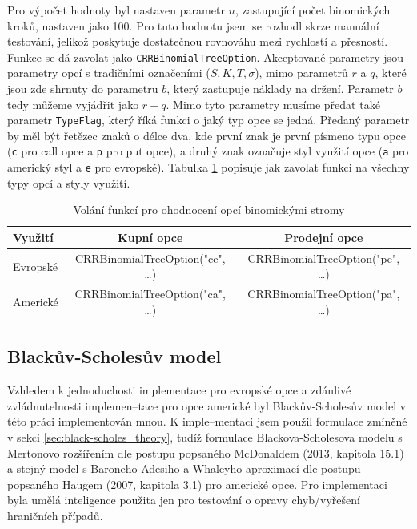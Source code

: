 \documentclass[male,czech,api_bc]{kitheses}
\begin{document}
  Pro výpočet hodnoty byl nastaven parametr $n$, zastupující počet binomických kroků, nastaven jako 100. Pro tuto hodnotu jsem se rozhodl skrze manuální testování, jelikož poskytuje dostatečnou rovnováhu mezi rychlostí a přesností. Funkce se dá zavolat jako \texttt{CRRBinomialTreeOption}. Akceptované parametry jsou parametry opcí s tradičními označeními ($S, K, T, \sigma$), mimo parametrů $r$ a $q$, které jsou zde shrnuty do parametru $b$, který zastupuje náklady na držení. Parametr $b$ tedy můžeme vyjádřit jako $r - q$. Mimo tyto parametry musíme předat také parametr \texttt{TypeFlag}, který říká funkci o jaký typ opce se jedná. Předaný parametr by měl být řetězec znaků o délce dva, kde první znak je první písmeno typu opce (\texttt{c} pro call opce a \texttt{p} pro put opce), a druhý znak označuje styl využití opce (\texttt{a} pro americký styl a \texttt{e} pro evropské). Tabulka \ref{tab:binom_calls} popisuje jak zavolat funkci na všechny typy opcí a styly využití.

  \begin{table}[h!]
    \centering
    \label{tab:binom_calls}
    \caption{Volání funkcí pro ohodnocení opcí binomickými stromy}
    \begin{tabular}{lcc}
      \toprule
      Využití & Kupní opce & Prodejní opce \\
      \midrule
      Evropské & CRRBinomialTreeOption("ce", \dots) & CRRBinomialTreeOption("pe", \dots) \\
      Americké & CRRBinomialTreeOption("ca", \dots) & CRRBinomialTreeOption("pa", \dots) \\
      \bottomrule
    \end{tabular}
  \end{table}


  \subsection{Blackův-Scholesův model}

  Vzhledem k jednoduchosti implementace pro evropské opce a zdánlivé zvládnutelnosti implemen--tace pro opce americké byl Blackův-Scholesův model v této práci implementován mnou. K imple--mentaci jsem použil formulace zmíněné v sekci \ref{sec:black-scholes_theory}, tudíž formulace Blackova-Scholesova modelu s Mertonovo rozšířením dle postupu popsaného McDonaldem (2013, kapitola 15.1) a stejný model s Baroneho-Adesiho a Whaleyho aproximací dle postupu popsaného Haugem (2007, kapitola 3.1) pro americké opce. Pro implementaci byla umělá inteligence použita jen pro testování o opravy chyb/vyřešení hraničních případů.
\end{document}
